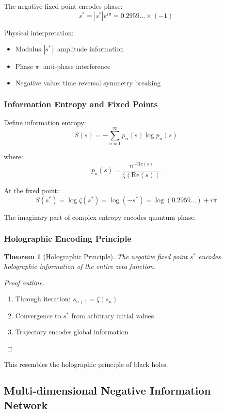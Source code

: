 \documentclass[11pt]{article}
\theoremstyle{plain}
\newtheorem{theorem}{Theorem}[section]
\theoremstyle{definition}
\theoremstyle{remark}
\begin{document}
The negative fixed point encodes phase:
$$s^* = |s^*| e^{i\pi} = 0.2959\ldots \times (-1)$$

Physical interpretation:
\begin{itemize}
\item Modulus $|s^*|$: amplitude information
\item Phase $\pi$: anti-phase interference
\item Negative value: time reversal symmetry breaking
\end{itemize}

\subsubsection{Information Entropy and Fixed Points}

Define information entropy:
$$S(s) = -\sum_{n=1}^{\infty} p_n(s) \log p_n(s)$$

where:
$$p_n(s) = \frac{n^{-\text{Re}(s)}}{\zeta(\text{Re}(s))}$$

At the fixed point:
$$S(s^*) = \log \zeta(s^*) = \log(-s^*) = \log(0.2959\ldots) + i\pi$$

The imaginary part of complex entropy encodes quantum phase.

\subsubsection{Holographic Encoding Principle}

\begin{theorem}[Holographic Principle]
The negative fixed point $s^*$ encodes holographic information of the entire zeta function.
\end{theorem}

\begin{proof}[Proof outline]
\begin{enumerate}
\item Through iteration: $s_{n+1} = \zeta(s_n)$
\item Convergence to $s^*$ from arbitrary initial values
\item Trajectory encodes global information
\end{enumerate}
\end{proof}

This resembles the holographic principle of black holes.

\subsection{Multi-dimensional Negative Information Network}
\end{document}
